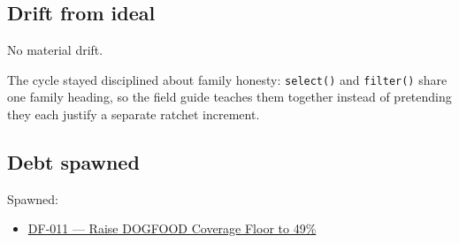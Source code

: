 \subsection{Drift from ideal}\label{record-072-drift-from-ideal}

No material drift.

The cycle stayed disciplined about family honesty: \texttt{s\allowbreak{}e\allowbreak{}l\allowbreak{}e\allowbreak{}c\allowbreak{}t\allowbreak{}(\allowbreak{})} and \texttt{f\allowbreak{}i\allowbreak{}l\allowbreak{}t\allowbreak{}e\allowbreak{}r\allowbreak{}(\allowbreak{})} share one family heading, so the field guide teaches them together instead of pretending they each justify a separate ratchet increment.

\subsection{Debt spawned}\label{record-072-debt-spawned}

Spawned:

\begin{itemize}
\tightlist
\item
  \href{https://github.com/flyingrobots/bijou/blob/cbd70612140e7a450d764b3c7be1c6af878b99bc/docs/design/DF-011-raise-dogfood-coverage-floor-to-49-percent.md}{DF-011 --- Raise DOGFOOD Coverage Floor to 49\%}
\end{itemize}

